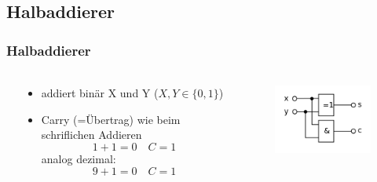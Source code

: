 \subsection{Halbaddierer} %
\label{sub:Halbaddierer}
\begin{frame}
    \frametitle{Halbaddierer}
    \framesubtitle{}
    \begin{columns}[c]
            \begin{center}
            \end{center}
            \begin{block}{}
                \begin{itemize}
                    \item addiert binär X und Y ($X,Y \in \{0,1\}$)
                    \item Carry (=Übertrag) wie beim schriflichen Addieren
                        \begin{equation*}
                            1 + 1 = 0 \quad C=1    
                        \end{equation*}
                        analog dezimal:
                        \begin{equation*}
                            9+1 = 0 \quad C=1   
                        \end{equation*}
                \end{itemize}
            \end{block}
            \begin{figure}[H]
            \begin{center}
                    \includegraphics[scale=0.5]{./img/schaltung/Halbadd.png}
            \end{center}
            \end{figure}
    \end{columns}    
\end{frame}


